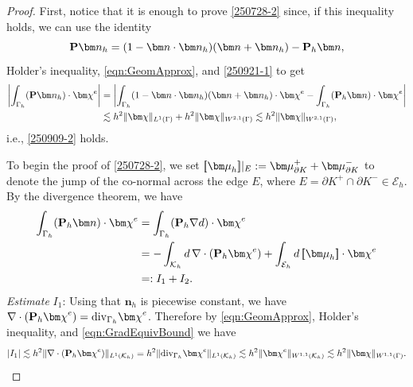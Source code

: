 \documentclass[10pt, a4paper]{amsart}
\def\jump#1{[\hspace{-2pt}[#1]\hspace{-2pt}]}
\newcommand{\bn}{{\bm n}}
\newcommand{\p}{\partial}
\newcommand{\nab}{\nabla}
\newcommand{\bmu}{{\bm \mu}}
\newcommand{\calE}{\mathcal{E}}
\newcommand{\calK}{\mathcal{K}}
\newcommand{\bchi}{{\bm \chi}}
\def\jump#1{[\hspace{-2pt}[#1]\hspace{-2pt}]}
\theoremstyle{definition}
\theoremstyle{remark}
\theoremstyle{example}
\numberwithin{equation}{section}
\begin{document}
\begin{proof}
First, notice that it is enough to prove \eqref{250728-2} since,
if this inequality holds, 
we can use the identity
\[
{\bf P}\bn_h
= (1 - \bn \cdot \bn_h)(\bn + \bn_h) - {\bf P}_h\bn,
\]
Holder's inequality, \eqref{eqn:GeomApprox}, and \eqref{250921-1} to get
%
\begin{align*}
\left|\int_{\Gamma_h}({\bf P}\bn_h) \cdot \bchi^e\right|
& = \left|\int_{\Gamma_h}(1 - \bn \cdot \bn_h)(\bn + \bn_h) \cdot \bchi^e - \int_{\Gamma_h}({\bf P}_h\bn) \cdot \bchi^e\right| \\
& \lesssim h^2\|\bchi\|_{L^1(\Gamma)} + h^2\|\bchi\|_{W^{2, 1}(\Gamma)} 
 \lesssim h^2\|\bchi\|_{W^{2, 1}(\Gamma)},
\end{align*}
i.e., \eqref{250909-2} holds. 

To begin the proof of \eqref{250728-2},
we set $\jump{\bmu_h}|_E := \bmu_{\p K}^+ + \bmu_{\p K}^-$ to denote
the jump of the co-normal across the edge $E$,
where $E = \p K^+\cap \p K^-\in \calE_h$.
By the divergence theorem, we have
%
\begin{equation}\label{eqn:PhnLemmaStart}
\begin{split}
\int_{\Gamma_h}({\bf P}_h\bn) \cdot \bchi^e
& = \int_{\Gamma_h}({\bf P}_h\nab d) \cdot \bchi^e \\
& = -\int_{\calK_h}d\,\nab \cdot ({\bf P}_h\bchi^e) + \int_{\calE_h}d\,\jump{\bmu_h} \cdot \bchi^e \\
& =: I_1 + I_2.
\end{split}
\end{equation}
\textit{Estimate} $I_1$:  Using that $\bn_h$ is piecewise constant, we have $ \nab \cdot ({\bf P}_h\bchi^e) = {\rm div}_{\Gamma_h} \bchi^e$.
%
Therefore by \eqref{eqn:GeomApprox}, Holder's inequality, and \eqref{eqn:GradEquivBound}
we have
\begin{equation}\label{eqn:PhnI1}
|I_1|
\lesssim h^2\|\nab \cdot ({\bf P}_h\bchi^e)\|_{L^1(\mathcal{K}_h)}
= h^2 \|{\rm div}_{\Gamma_h} \bchi^e\|_{L^1(\calK_h)}
\lesssim h^2\|\bchi^e\|_{W^{1, 1}(\calK_h)}
\lesssim h^2\|\bchi\|_{{W}^{1, 1}(\Gamma)}.
\end{equation}



\end{proof}
\end{document}
